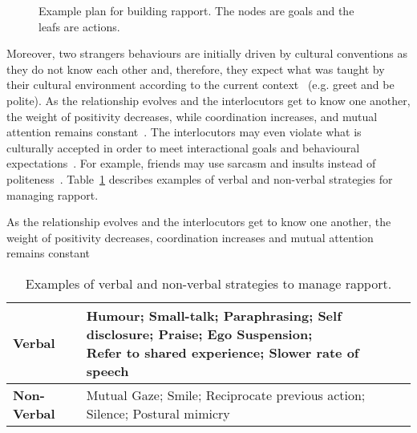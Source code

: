 \begin{figure}[H]
	\centering
	\caption{Example plan for building rapport. The nodes are goals and the leafs are actions.}
	\label{table:BuildingRapportPlan}
\end{figure}

Moreover, two strangers behaviours are initially driven by cultural conventions as they do not know each other and, therefore, they expect what was taught by their cultural environment according to the current context~\cite{Zhao2014} (e.g. greet and be polite). As the relationship evolves and the interlocutors get to know one another, the weight of positivity decreases, while coordination increases, and mutual attention remains constant~\cite{Zhao2014, Tickle-Degnen1990}. The interlocutors may even violate what is culturally accepted in order to meet interactional goals and behavioural expectations~\cite{Zhao2014}. For example, friends may use sarcasm and insults instead of politeness~\cite{Zhao2014}. Table~\ref{table:rapportStrategies} describes examples of verbal and non-verbal strategies for managing rapport.

As the relationship evolves and the interlocutors get to know one another, the weight of positivity decreases, coordination increases and mutual attention remains constant 

\begin{table}[H]
	\centering
	\begin{tabular}{|l|l|}
	\hline
	\textbf{Verbal} & \specialcell{Humour; Small-talk; Paraphrasing; Self disclosure; Praise; Ego Suspension;\\ Refer to shared experience; Slower rate of speech} \\ \hline
	\textbf{Non-Verbal} & Mutual Gaze; Smile; Reciprocate previous action; Silence; Postural mimicry \\ \hline
	\end{tabular}
	\caption{Examples of verbal and non-verbal strategies to manage rapport.}
	\label{table:rapportStrategies}
\end{table}

